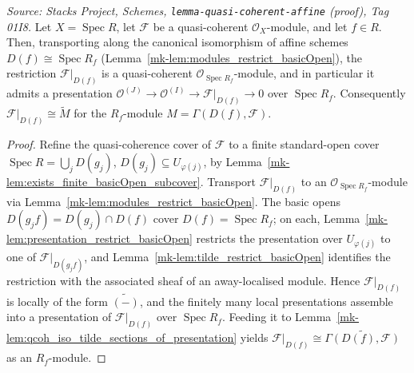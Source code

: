\begin{lemma}
  \label{mk-lem:isQuasicoherent_restrict_basicOpen}

  \textit{Source: Stacks Project, Schemes, \texttt{lemma-quasi-coherent-affine} (proof),
  Tag 01I8.}
  Let \(X = \operatorname{Spec} R\), let \(\mathcal{F}\) be a quasi-coherent
  \(\mathcal{O}_X\)-module, and let \(f \in R\). Then, transporting along the canonical
  isomorphism of affine schemes \(D(f) \cong \operatorname{Spec} R_f\)
  (Lemma~\ref{mk-lem:modules_restrict_basicOpen}), the restriction \(\mathcal{F}|_{D(f)}\) is a
  quasi-coherent \(\mathcal{O}_{\operatorname{Spec} R_f}\)-module, and in particular it admits a
  presentation \(\mathcal{O}^{(J)} \to \mathcal{O}^{(I)} \to \mathcal{F}|_{D(f)} \to 0\) over
  \(\operatorname{Spec} R_f\). Consequently \(\mathcal{F}|_{D(f)} \cong \widetilde{M}\) for the
  \(R_f\)-module \(M = \Gamma(D(f), \mathcal{F})\).
\end{lemma}
\begin{proof}
  Refine the quasi-coherence cover of \(\mathcal{F}\) to a finite standard-open cover
  \(\operatorname{Spec} R = \bigcup_j D(g_j)\), \(D(g_j) \subseteq U_{\varphi(j)}\), by
  Lemma~\ref{mk-lem:exists_finite_basicOpen_subcover}. Transport \(\mathcal{F}|_{D(f)}\) to an
  \(\mathcal{O}_{\operatorname{Spec} R_f}\)-module via
  Lemma~\ref{mk-lem:modules_restrict_basicOpen}. The basic opens
  \(D(g_j f) = D(g_j) \cap D(f)\) cover \(D(f) = \operatorname{Spec} R_f\); on each,
  Lemma~\ref{mk-lem:presentation_restrict_basicOpen} restricts the presentation over
  \(U_{\varphi(j)}\) to one of \(\mathcal{F}|_{D(g_j f)}\), and
  Lemma~\ref{mk-lem:tilde_restrict_basicOpen} identifies the restriction with the associated sheaf
  of an away-localised module. Hence \(\mathcal{F}|_{D(f)}\) is locally of the form
  \(\widetilde{(-)}\), and the finitely many local presentations assemble into a presentation of
  \(\mathcal{F}|_{D(f)}\) over \(\operatorname{Spec} R_f\). Feeding it to
  Lemma~\ref{mk-lem:qcoh_iso_tilde_sections_of_presentation} yields
  \(\mathcal{F}|_{D(f)} \cong \widetilde{\Gamma(D(f), \mathcal{F})}\) as an \(R_f\)-module.
\end{proof}

